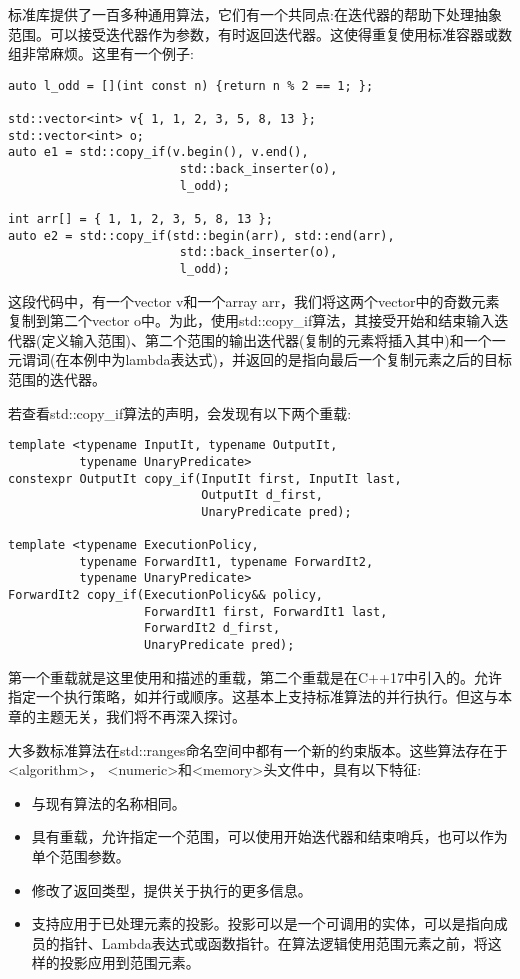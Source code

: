 标准库提供了一百多种通用算法，它们有一个共同点:在迭代器的帮助下处理抽象范围。可以接受迭代器作为参数，有时返回迭代器。这使得重复使用标准容器或数组非常麻烦。这里有一个例子:

\begin{lstlisting}[style=styleCXX]
auto l_odd = [](int const n) {return n % 2 == 1; };

std::vector<int> v{ 1, 1, 2, 3, 5, 8, 13 };
std::vector<int> o;
auto e1 = std::copy_if(v.begin(), v.end(),
						std::back_inserter(o),
						l_odd);
						
int arr[] = { 1, 1, 2, 3, 5, 8, 13 };
auto e2 = std::copy_if(std::begin(arr), std::end(arr),
						std::back_inserter(o),
						l_odd);
\end{lstlisting}

这段代码中，有一个vector v和一个array arr，我们将这两个vector中的奇数元素复制到第二个vector o中。为此，使用std::copy\_if算法，其接受开始和结束输入迭代器(定义输入范围)、第二个范围的输出迭代器(复制的元素将插入其中)和一个一元谓词(在本例中为lambda表达式)，并返回的是指向最后一个复制元素之后的目标范围的迭代器。

若查看std::copy\_if算法的声明，会发现有以下两个重载:

\begin{lstlisting}[style=styleCXX]
template <typename InputIt, typename OutputIt,
		  typename UnaryPredicate>
constexpr OutputIt copy_if(InputIt first, InputIt last,
						   OutputIt d_first,
						   UnaryPredicate pred);
						   
template <typename ExecutionPolicy,
		  typename ForwardIt1, typename ForwardIt2,
		  typename UnaryPredicate>
ForwardIt2 copy_if(ExecutionPolicy&& policy,
				   ForwardIt1 first, ForwardIt1 last,
				   ForwardIt2 d_first,
				   UnaryPredicate pred);
\end{lstlisting}

第一个重载就是这里使用和描述的重载，第二个重载是在C++17中引入的。允许指定一个执行策略，如并行或顺序。这基本上支持标准算法的并行执行。但这与本章的主题无关，我们将不再深入探讨。

大多数标准算法在std::ranges命名空间中都有一个新的约束版本。这些算法存在于<algorithm>， <numeric>和<memory>头文件中，具有以下特征:

\begin{itemize}
\item
与现有算法的名称相同。

\item
具有重载，允许指定一个范围，可以使用开始迭代器和结束哨兵，也可以作为单个范围参数。

\item
修改了返回类型，提供关于执行的更多信息。

\item
支持应用于已处理元素的投影。投影可以是一个可调用的实体，可以是指向成员的指针、Lambda表达式或函数指针。在算法逻辑使用范围元素之前，将这样的投影应用到范围元素。
\end{itemize}

